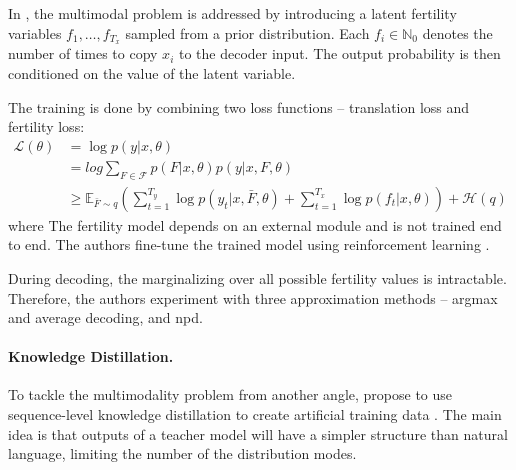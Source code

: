 In \citet{gu2017nonautoregressive}, the multimodal problem is addressed by
introducing a latent fertility variables $f_1, \ldots, f_{T_x}$ sampled from a
prior distribution. Each $f_i \in \mathbb{N}_0$ denotes the number of times to
copy $x_i$ to the decoder input. The output probability is then conditioned on
the value of the latent variable.

The training is done by combining two loss functions -- translation loss and
fertility loss:
\begin{align}
  \mathcal{L}(\theta)  & = \log p(y|x, \theta) \\
                       & = log \sum_{F \in \mathcal{F}} p(F| x, \theta ) p(y | x, F, \theta) \\
                       & \geq \mathbb{E}_{\bar{F} \sim q}
                         \left(
                         \sum_{t=1}^{T_y} \log p(y_t | x, \bar{F}, \theta)
                         + \sum_{t=1}^{T_x} \log p(f_t | x, \theta)
                         \right)
                         + \mathcal{H}(q)
\end{align}
%
where 
%
The fertility model depends on an external module and is not trained end to
end. The authors fine-tune the trained model using reinforcement learning
\citep{williams1992simple}.

During decoding, the marginalizing over all possible fertility values is intractable. Therefore, the authors experiment with three approximation methods -- argmax and average decoding, and \ac{npd}.

\paragraph{Knowledge Distillation.} To tackle the multimodality problem from
another angle, \citet{gu2017nonautoregressive} propose to use sequence-level
knowledge distillation to create artificial training data
\citep{kim-rush-2016-sequence}. The main idea is that outputs of a teacher
model will have a simpler structure than natural language, limiting the number
of the distribution modes.


